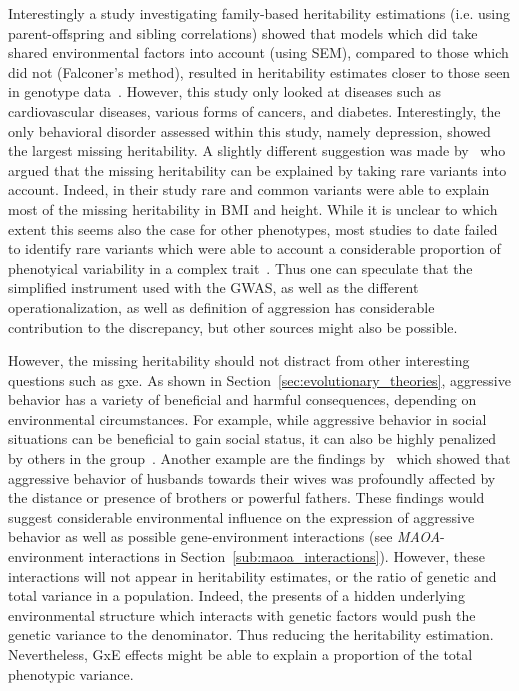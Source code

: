 Interestingly a study investigating family-based heritability estimations (i.e. using parent-offspring and sibling correlations) showed that models which did take shared environmental factors into account (using SEM), compared to those which did not (Falconer's method), resulted in heritability estimates closer to those seen in genotype data~\citet{Munoz2016a}.
However, this study only looked at diseases such as cardiovascular diseases, various forms of cancers, and diabetes.
Interestingly, the only behavioral  disorder assessed within this study, namely depression, showed the largest missing heritability.
A slightly different suggestion was made by~\citet{Yang2015} who argued that the missing heritability can be explained by taking rare variants into account.
Indeed, in their study rare and common variants were able to explain most of the missing heritability in BMI and height.
While it is unclear to which extent this seems also the case for other phenotypes, most studies to date failed to identify rare variants which were able to account a considerable proportion of phenotyical variability in a complex trait~\cite{Chabris2015,Wray2011}.
Thus one can speculate that the simplified instrument used with the GWAS, as well as the different operationalization, as well as definition of aggression has considerable contribution to the discrepancy, but other sources might also be possible.

However, the missing heritability should not distract from other interesting questions such as \acrfull{gxe}.
As shown in Section~\ref{sec:evolutionary_theories}, aggressive behavior has a variety of beneficial and harmful consequences, depending on environmental circumstances. 
For example, while aggressive behavior in social situations can be beneficial to gain social status, it can also be highly penalized by others in the group~\cite{Buss1997}.
Another example are the findings by~\citet{Figueredo1995} which showed that aggressive behavior of husbands towards their wives was profoundly affected by the distance or presence of brothers or powerful fathers.
These findings would suggest considerable environmental influence on the expression of aggressive behavior as well as possible gene-environment interactions (see \textit{MAOA}-environment interactions in Section~\ref{sub:maoa_interactions}).
However, these interactions will not appear in heritability estimates, or the ratio of genetic and total variance in a population.
Indeed, the presents of a hidden underlying environmental structure which interacts with genetic factors would push the genetic variance to the denominator.
Thus reducing the heritability estimation.
Nevertheless, GxE effects might be able to explain a proportion of the total phenotypic variance.

